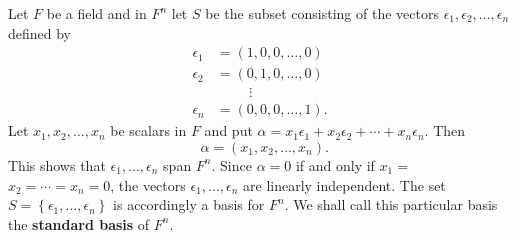 \documentclass[main.tex]{subfiles}
\begin{document}
\begin{example}
Let $F$ be a field and in $F^n$ let $S$ be the subset consisting of the vectors $\epsilon_1, \epsilon_2, \ldots, \epsilon_n$ defined by
$$
\begin{aligned}
\epsilon_1 & =(1,0,0, \ldots, 0) \\
\epsilon_2 & =(0,1,0, \ldots, 0) \\
& \hspace{1cm}\vdots \\
\epsilon_n & =(0,0,0, \ldots, 1) .
\end{aligned}
$$
Let $x_1, x_2, \ldots, x_n$ be scalars in $F$ and put $\alpha=x_1 \epsilon_1+x_2 \epsilon_2+\cdots+x_n \epsilon_n$. Then
$$
\quad \alpha=\left(x_1, x_2, \ldots, x_n\right) \text {. }
$$
This shows that $\epsilon_1, \ldots, \epsilon_n$ span $F^n$. Since $\alpha=0$ if and only if $x_1=$ $x_2=\cdots=x_n=0$, the vectors $\epsilon_1, \ldots, \epsilon_n$ are linearly independent. The set $S=\left\{\epsilon_1, \ldots, \epsilon_n\right\}$ is accordingly a basis for $F^n$. We shall call this particular basis the \textbf{standard basis} of $F^n$.
\end{example}
\end{document}

